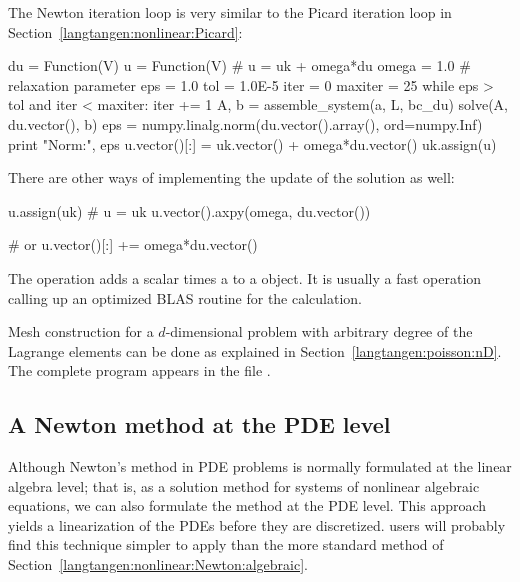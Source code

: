 The Newton iteration loop is very similar to the Picard iteration loop
in Section~\ref{langtangen:nonlinear:Picard}:
\begin{python}
du = Function(V)
u  = Function(V)  # u = uk + omega*du
omega = 1.0       # relaxation parameter
eps = 1.0
tol = 1.0E-5
iter = 0
maxiter = 25
while eps > tol and iter < maxiter:
    iter += 1
    A, b = assemble_system(a, L, bc_du)
    solve(A, du.vector(), b)
    eps = numpy.linalg.norm(du.vector().array(), ord=numpy.Inf)
    print "Norm:", eps
    u.vector()[:] = uk.vector() + omega*du.vector()
    uk.assign(u)
\end{python}
There are other ways of implementing the
update of the solution as well:
\begin{python}
u.assign(uk)  # u = uk
u.vector().axpy(omega, du.vector())

# or
u.vector()[:] += omega*du.vector()
\end{python}
The  operation adds a scalar  times a
  to a  object.  It is usually a fast
operation calling up an optimized BLAS routine for the calculation.

Mesh construction for a $d$-dimensional problem with arbitrary degree
of the Lagrange elements can be done as explained in
Section~\ref{langtangen:poisson:nD}.  The complete program appears in
the file .

\subsection{A Newton method at the PDE level}
\label{langtangen:nonlinear:Newton:pdelevel}
\label{Newton's method}

Although Newton's method in PDE problems is normally formulated at the
linear algebra level; that is, as a solution method for systems of nonlinear
algebraic equations, we can also formulate the method at the PDE level.
This approach yields a linearization of the PDEs before they are discretized.
\fenics{} users will probably find this technique simpler to apply than
the more standard method of Section~\ref{langtangen:nonlinear:Newton:algebraic}.


